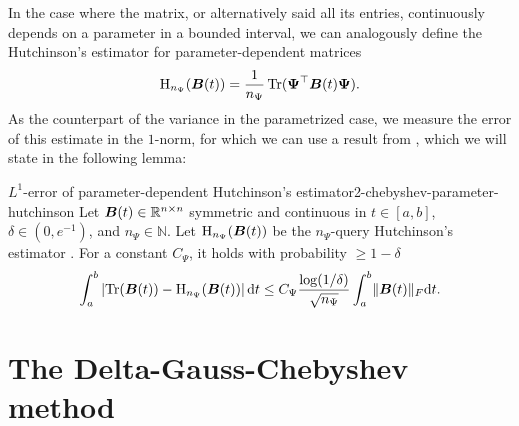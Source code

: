 In the case where the matrix, or alternatively said all its entries, continuously depends on a
parameter in a bounded interval, we can analogously define the Hutchinson's
estimator for parameter-dependent matrices
\begin{equation}
    \operatorname{H}_{n_{\Psi}}(\boldsymbol{B}(t)) = \frac{1}{n_{\Psi}} \operatorname{Tr}(\boldsymbol{\Psi}^{\top} \boldsymbol{B}(t) \boldsymbol{\Psi}).
    \label{equ:2-chebyshev-DGC-hutchionson-estimator-parameter}
\end{equation}
As the counterpart of the variance in the parametrized case, we measure the
error of this estimate in the $1$-norm, for which we can use a result
from \cite{he2023parameter}, which we will state in the following lemma:
\begin{lemma}{$L^1$-error of parameter-dependent Hutchinson's estimator}{2-chebyshev-parameter-hutchinson}
    Let $\boldsymbol{B}(t) \in \mathbb{R}^{n \times n}$ symmetric and continuous in
    $t \in [a, b]$, $\delta \in (0, e^{-1})$, and $n_{\Psi} \in \mathbb{N}$.
    Let $\operatorname{H}_{n_{\Psi}}(\boldsymbol{B}(t))$ be the $n_{\Psi}$-query
    Hutchinson's estimator .
    For a constant $C_{\Psi}$, it holds with probability $\geq 1 - \delta$
    \begin{equation}
        \int_{a}^{b} \left| \operatorname{Tr}(\boldsymbol{B}(t)) - \operatorname{H}_{n_{\Psi}}(\boldsymbol{B}(t)) \right| \mathrm{d}t \leq C_{\Psi} \frac{\log(1/\delta)}{\sqrt{n_{\Psi}}} \int_{a}^{b} \lVert \boldsymbol{B}(t) \rVert _F \mathrm{d}t.
    \end{equation}
\end{lemma}


\section{The Delta-Gauss-Chebyshev method}
\label{sec:2-chebyshev-delta-gauss-chebyshev}


